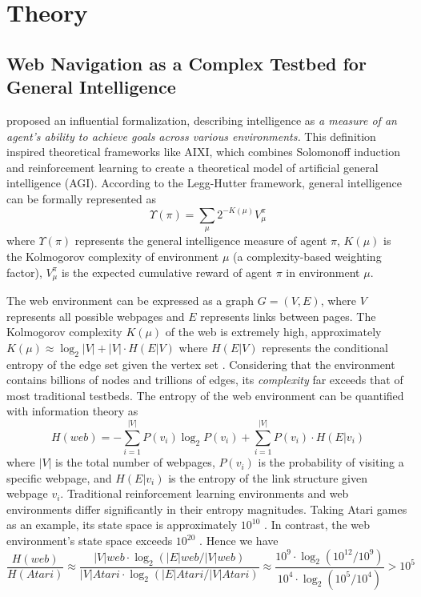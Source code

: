 \documentclass{article}
\begin{document}
\section{Theory}
\label{sec:theory}
\subsection{Web Navigation as a Complex Testbed for General Intelligence}

\citet{legg2007universal} proposed an influential formalization, describing intelligence as \textit{a measure of an agent's ability to achieve goals across various environments.} This definition inspired theoretical frameworks like AIXI, which combines Solomonoff induction \cite{legg1997solomonoff} and reinforcement learning to create a theoretical model of artificial general intelligence (AGI). According to the Legg-Hutter framework, general intelligence can be formally represented as
\begin{equation}
\Upsilon(\pi) = \sum_{\mu} 2^{-K(\mu)} V^{\pi}_{\mu} 
\end{equation}
where $\Upsilon(\pi)$ represents the general intelligence measure of agent $\pi$, $K(\mu)$ is the Kolmogorov complexity of environment $\mu$ (a complexity-based weighting factor), $V^{\pi}_{\mu}$ is the expected cumulative reward of agent $\pi$ in environment $\mu$. 

The web environment can be expressed as a graph $G = (V, E)$, where $V$ represents all possible webpages and $E$ represents links between pages. The Kolmogorov complexity $K(\mu)$ of the web is extremely high, approximately $K(\mu) \approx \log_2|V| + |V|\cdot H(E|V)$ where $H(E|V)$ represents the conditional entropy of the edge set given the vertex set \citep{li2008introduction}. Considering that the environment contains billions of nodes and trillions of edges, its \textit{complexity} far exceeds that of most traditional testbeds. The entropy of the web environment can be quantified with information theory as
\begin{equation}
H(web) = -\sum_{i=1}^{|V|} P(v_i) \log_2 P(v_i) + \sum_{i=1}^{|V|} P(v_i) \cdot H(E|v_i)
\end{equation}
where $|V|$ is the total number of webpages, $P(v_i)$ is the probability of visiting a specific webpage, and $H(E|v_i)$ is the entropy of the link structure given webpage $v_i$. Traditional reinforcement learning environments and web environments differ significantly in their entropy magnitudes. Taking Atari games as an example, its state space is approximately $10^{10}$ \citep{mnih2015human, bellemare2013arcade}. In contrast, the web environment's state space exceeds $10^{20}$ \citep{broder2000graph}. Hence we have
\begin{equation}
\frac{H(web)}{H(Atari)} \approx \frac{|V|{web} \cdot \log_2(|E|{web}/|V|{web})}{|V|{Atari} \cdot \log_2(|E|{Atari}/|V|{Atari})} \approx \frac{10^9 \cdot \log_2(10^{12}/10^9)}{10^4 \cdot \log_2(10^5/10^4)} > 10^5
\end{equation}
\end{document}
